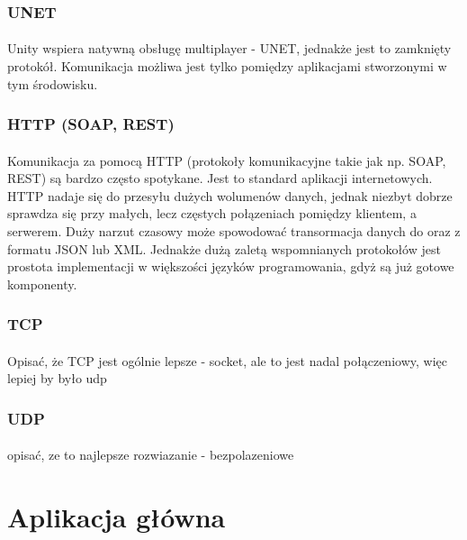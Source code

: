 \documentclass[12pt]{article}
\begin{document}
{\subsubsection{UNET}
\paragraph{}
Unity wspiera natywną obsługę multiplayer - UNET, jednakże jest to zamknięty protokół. Komunikacja możliwa jest tylko pomiędzy aplikacjami stworzonymi w tym środowisku.

\subsubsection{HTTP (SOAP, REST)}
\paragraph{}
Komunikacja za pomocą HTTP (protokoły komunikacyjne takie jak np. SOAP, REST) są bardzo często spotykane. Jest to standard aplikacji internetowych. HTTP nadaje się do przesyłu dużych wolumenów danych, jednak niezbyt dobrze sprawdza się przy małych, lecz częstych połązeniach pomiędzy klientem, a serwerem. Duży narzut czasowy może spowodować transormacja danych do oraz z formatu JSON lub XML. Jednakże dużą zaletą wspomnianych protokołów jest prostota implementacji w większości języków programowania, gdyż są już gotowe komponenty.
\subsubsection{TCP}
\paragraph{}
{\color{red}Opisać, że TCP jest ogólnie lepsze - socket, ale to jest nadal połączeniowy, więc lepiej by było udp}
\subsubsection{UDP}
\paragraph{}
{\color{red}opisać, ze to najlepsze rozwiazanie - bezpolazeniowe}

\newpage
\section{Aplikacja główna}


}
\end{document}
